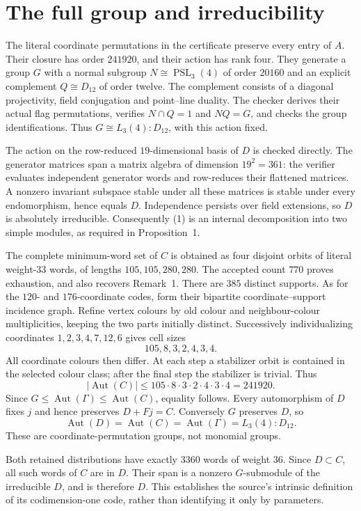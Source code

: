 \documentclass[11pt,a4paper]{article}
\newcommand{\Aut}{\operatorname{Aut}}
\begin{document}
\section{The full group and irreducibility}
The literal coordinate permutations in the certificate preserve every
entry of $A$. Their closure has order $241920$, and their action has
rank four. They generate a group $G$ with a normal subgroup
$N\cong\operatorname{PSL}_3(4)$ of order $20160$ and an explicit
complement $Q\cong D_{12}$ of order twelve. The complement consists of
a diagonal projectivity, field conjugation and point--line duality.
The checker derives their actual flag permutations, verifies
$N\cap Q=1$ and $NQ=G$, and checks the group identifications.
Thus $G\cong L_3(4):D_{12}$, with this action fixed.

The action on the row-reduced $19$-dimensional basis of $D$ is checked
directly. The generator matrices span a matrix algebra of dimension
$19^2=361$: the verifier evaluates independent generator words and
row-reduces their flattened matrices. A nonzero invariant subspace stable
under all these matrices is stable under every endomorphism, hence equals
$D$. Independence persists over field extensions, so $D$ is absolutely
irreducible. Consequently (1) is an internal decomposition into two simple
modules, as required in Proposition~1.

The complete minimum-word set of $C$ is obtained as four disjoint orbits
of literal weight-$33$ words, of lengths $105,105,280,280$.
The accepted count $770$ proves exhaustion, and also recovers Remark~1.
There are $385$ distinct supports. As for the $120$- and $176$-coordinate
codes, form their bipartite coordinate--support incidence graph.
Refine vertex colours by old colour and neighbour-colour multiplicities,
keeping the two parts initially distinct. Successively individualizing
coordinates $1,2,3,4,7,12,6$ gives cell sizes
\[
 105,8,3,2,4,3,4.
\]
All coordinate colours then differ. At each step a stabilizer orbit is
contained in the selected colour class; after the final step the
stabilizer is trivial. Thus
\[
 |\Aut(C)|\leq105\cdot8\cdot3\cdot2\cdot4\cdot3\cdot4=241920.
\]
Since $G\leq\Aut(\Gamma)\leq\Aut(C)$, equality follows.
Every automorphism of $D$ fixes $j$ and hence preserves $D+Fj=C$.
Conversely $G$ preserves $D$, so
\[
 \Aut(D)=\Aut(C)=\Aut(\Gamma)=L_3(4):D_{12}.          \tag{2}
\]
These are coordinate-permutation groups, not monomial groups.

Both retained distributions have exactly $3360$ words of weight $36$.
Since $D\subset C$, all such words of $C$ are in $D$.
Their span is a nonzero $G$-submodule of the irreducible $D$, and is
therefore $D$. This establishes the source's intrinsic definition of its
codimension-one code, rather than identifying it only by parameters.
\end{document}

